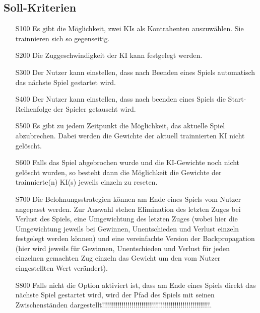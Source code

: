 \documentclass[titlepage]{scrartcl}
\begin{document}
	\subsection{Soll-Kriterien}
	\begin{itemize}
		\item[S100] Es gibt die Möglichkeit, zwei KIs als Kontrahenten auszuwählen. Sie trainnieren sich so gegenseitig.
		\item[S200] Die Zuggeschwindigkeit der KI kann festgelegt werden.
		\item[S300] Der Nutzer kann einstellen, dass nach Beenden eines Spiels automatisch das nächste Spiel gestartet wird.
		\item[S400] Der Nutzer kann einstellen, dass nach beenden eines Spiels die Start-Reihenfolge der Spieler getauscht wird.
		\item[S500] Es gibt zu jedem Zeitpunkt die Möglichkeit, das aktuelle Spiel abzubrechen. Dabei werden die Gewichte der aktuell trainnierten KI nicht gelöscht.
		\item[S600] Falls das Spiel abgebrochen wurde und die KI-Gewichte noch nicht gelöscht wurden, so besteht dann die Möglichkeit die Gewichte der trainnierte(n) KI(s) jeweils einzeln zu reseten.
		\item[S700] Die Belohnungsstrategien können am Ende eines Spiels vom Nutzer angepasst werden. Zur Auswahl stehen Elimination des letzten Zuges bei Verlust des Spiels, eine Umgewichtung des letzten Zuges (wobei hier die Umgewichtung jeweils bei Gewinnen, Unentschieden und Verlust einzeln festgelegt werden können) und eine vereinfachte Version der Backpropagation (hier wird jeweils für Gewinnen, Unentschieden und Verlust für jeden einzelnen gemachten Zug einzeln das Gewicht um den vom Nutzer eingestellten Wert verändert).
		\item[S800] Falls nicht die Option aktiviert ist, dass am Ende eines Spiels direkt das nächste Spiel gestartet wird, wird der Pfad des Spiels mit seinen Zwischenständen dargestellt!!!!!!!!!!!!!!!!!!!!!!!!!!!!!!!!!!!!!!!!!!!!!!!!!!!!!!!.
	\end{itemize}
\end{document}
